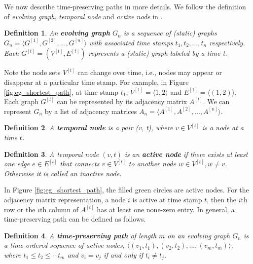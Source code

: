 \documentclass[12pt]{article}
\newtheorem{definition}{Definition}
\theoremstyle{definition}
\begin{document}
We now describe time-preserving paths in more details. We follow the definition of
\emph{evolving graph}, \emph{temporal node} and \emph{active node} in \cite{chen16}.

\begin{definition}
  An \textbf{evolving graph} $G_n$ is a sequence of (static) graphs
$G_n = \langle G^{[1]}, G^{[2]},  \ldots ,G^{[n]} \rangle$ with associated time stamps
$t_1, t_2, \ldots, t_n$ respectively. Each $G^{[t]} = (V^{[t]}, E^{[t]})$ represents a (static) graph labeled by a time t.
\end{definition}

Note the node sets $V^{[t]}$ can change over time, i.e., nodes may appear or disappear at a particular time stamp.
For example, in Figure \ref{fig:eg_shortest_path}, at time stamp $t_1$, $V^{[1]} = \langle 1, 2 \rangle$ and $E^{[1]} = \langle (1,2) \rangle$. Each graph $G^{[t]}$ can be represented by its adjacency matrix $A^{[t]}$.
We can represent $G_n$ by a list of adjacency matrices $A_n = \langle A^{[1]}, A^{[2]}, \ldots, A^{[n]} \rangle$.


\begin{definition}
  A \textbf{temporal node} is a pair (v, t), where $v \in V^{[t]}$ is a node at a time $t$.
\end{definition}


\begin{definition}
  A temporal node $(v, t)$ is an \textbf{active node} if there exists at least one edge $e \in E^{[t]}$ that connects $v \in V^{[t]}$ to another node $w \in V^{[t]}, w\ne v$. Otherwise it is called an inactive node.
\end{definition}

In Figure \ref{fig:eg_shortest_path}, the filled green circles are active nodes. For the adjacency matrix representation, a node $i$ is active at time stamp $t$, then
the $i$th row or the $i$th column of $A^{[t]}$ has at least one none-zero entry.
 In general, a time-preserving path can be defined as follows.

\begin{definition}
A \textbf{time-preserving path}  of length $m$ on an evolving graph $G_n$ is a time-ordered sequence of active nodes, $\langle (v_1, t_1), (v_2, t_2), \ldots, (v_m, t_m) \rangle$, where $t_1 \le t_2 \le \cdots t_m$ and
$v_i = v_j$ if and only if $t_i \ne t_j$.
\end{definition}
\end{document}
